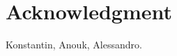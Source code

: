 

%

%









%   















\section*{Acknowledgment}
Konstantin, Anouk, Alessandro. 








  


